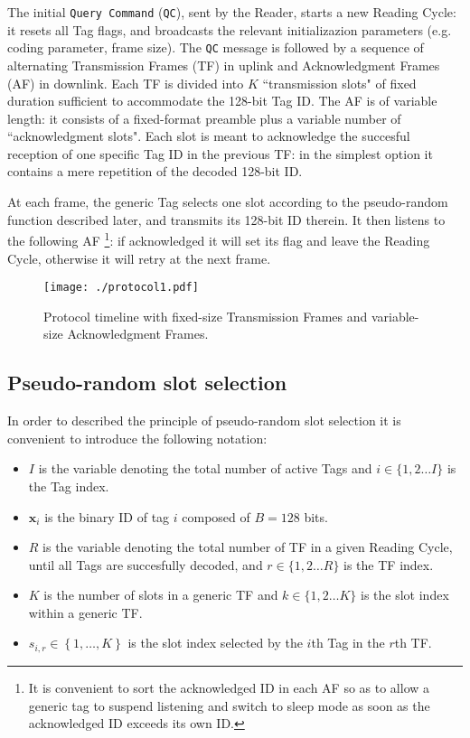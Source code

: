 \documentclass[12pt,draftcls,onecolumn]{IEEEtran}
\begin{document}
The initial \texttt{Query Command} (\texttt{QC}), sent by the Reader, starts a new Reading Cycle: it resets all Tag flags,  and broadcasts the relevant initializazion parameters (e.g. coding parameter, frame size).
The \texttt{QC} message is followed by a sequence of alternating Transmission Frames (TF) in uplink and Acknowledgment Frames (AF) in downlink.
Each TF  is divided into $K$ ``transmission slots" of fixed duration sufficient to accommodate the 128-bit Tag ID.
The AF is of variable length: it consists of a fixed-format preamble plus a variable number of ``acknowledgment slots". Each slot is meant to acknowledge the succesful reception of one specific Tag ID in the previous TF: in the simplest option it contains a mere repetition of the decoded 128-bit ID.

At each frame, the generic Tag selects one slot according to the pseudo-random function described later, and transmits its 128-bit ID therein.
It then listens  to the following AF \footnote{It is convenient to sort the acknowledged ID in each AF so as to allow a generic tag to suspend listening and switch to sleep mode as soon as the acknowledged ID exceeds its own ID.}:
if  acknowledged it will set its flag and leave the Reading Cycle, otherwise it will retry at the next frame.

\begin{figure}[tb]
\centering
\texttt{[image: ./protocol1.pdf]}

\caption{Protocol timeline with fixed-size Transmission Frames
and variable-size Acknowledgment Frames.  }
\label{fig:proto}
\end{figure}

\newcommand{\myxi}{\mathbf{\boldsymbol{x}}_{i}}

\subsection{Pseudo-random slot selection}\label{sec:selalg}

In order to described the principle of pseudo-random slot selection it is convenient to introduce the following notation:
\begin{itemize}
\item $I$ is the variable denoting the total number of active Tags and $i \in \{1,2 \ldots I \}$ is the Tag index.
\item $\myxi$  is the binary ID of tag $i$ composed of $B=128$ bits.
\item $R$ is the variable denoting the total number of TF in a given Reading Cycle, until all Tags are succesfully decoded, and $r \in \{1,2 \ldots R \}$ is the TF index.
\item $K$ is the number of slots in a generic TF and  $k \in \{1,2 \ldots K \}$ is the slot index within a generic TF.
\item $s_{i,r}\in\left\{ 1,\ldots,K\right\} $ is the slot index selected by the $i$th Tag in the $r$th TF.
\end{itemize}
\end{document}
